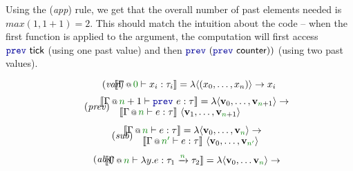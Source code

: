 Using the (\emph{app}) rule, we get that the overall number of past elements needed is
$\mathit{max}(1, 1+1) = 2$. This should match the intuition about the code -- when the first function
is applied to the argument, the computation will first access $\kvd{prev}~\ident{tick}$ (using one
past value) and then $\kvd{prev}~(\kvd{prev}~\ident{counter}))$ (using two past values).


\begin{figure}
\begin{equation}
\tag{\emph{var}}
\hspace{-1em}
\sem{\coctx{\Gamma}{\cclrd{0}} \vdash x_i : \tau_i} = \lambda \langle(x_0, \ldots, x_n)\rangle \rightarrow x_i
\end{equation}
\vspace{-1.0em}
\begin{equation}
\tag{\emph{prev}}
\hspace{-1.5em}
\begin{array}{l}
\sem{\coctx{\Gamma}{\cclrd{n}+1} \vdash \kvd{prev}~e : \tau} = \lambda \langle \mathbf{v}_0, \ldots, \mathbf{v}_{\cclrd{n}+1} \rangle \rightarrow\\[-0.1em]
  \qquad\sem{ \coctx{\Gamma}{ \cclrd{n} } \vdash e : \tau }~\langle \mathbf{v}_1, \ldots, \mathbf{v}_{ \cclrd{n}+1 }\rangle
\end{array}
\end{equation}
\vspace{-0.5em}
\begin{equation}
\tag{\emph{sub}}
\hspace{-1.5em}
\begin{array}{l}
\sem{\coctx{\Gamma}{\cclrd{n}} \vdash e : \tau} = \lambda \langle \mathbf{v}_0, \ldots, \mathbf{v}_{\cclrd{n}} \rangle \rightarrow\\[-0.1em]
  \qquad\sem{ \coctx{\Gamma}{ \cclrd{n'} } \vdash e : \tau }~\langle \mathbf{v}_0, \ldots, \mathbf{v}_{ \cclrd{n'} }\rangle
\end{array}
\end{equation}
\vspace{-0.5em}
\begin{equation}
\tag{\emph{abs}}
\hspace{-1.5em}
\begin{array}{l}
  \sem{\coctx{\Gamma}{\cclrd{n}} \vdash \lambda y. e : \tau_1 \xrightarrow{\cclrd{n}} \tau_2 } = 
    \lambda \langle \mathbf{v}_0, \ldots \mathbf{v}_{\cclrd{n}} \rangle \rightarrow\\[-0.1em]

\end{array}
\end{equation}
\end{figure}
